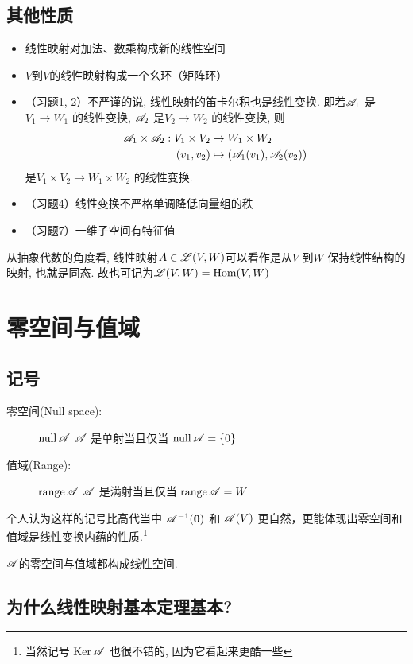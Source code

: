 \subsection{其他性质}
\begin{itemize}
    \item 线性映射对加法、数乘构成新的线性空间
    \item \(V\)到\(V\)的线性映射构成一个幺环（矩阵环）
    \item （习题1, 2）不严谨的说, 线性映射的笛卡尔积也是线性变换. 即若\(\mathscr{A}_{1}\)
        是\(V_{1} \to W_{1}\) 的线性变换, \(\mathscr{A}_{2}\)
        是\(V_{2} \to W_{2}\) 的线性变换, 则
        \begin{align*}
            \mathscr{A}_{1} \times \mathscr{A}_{2} : V_{1}
            \times V_{2} &\to W_{1} \times W_{2}\\
            (v_{1},v_{2}) &\mapsto
            (\mathscr{A}_{1}(v_{1}),\mathscr{A}_{2}(v_{2}))
        \end{align*}
        是\(V_{1} \times V_{2} \to
        W_{1} \times W_{2}\) 的线性变换.
    \item （习题4）线性变换不严格单调降低向量组的秩
    \item （习题7）一维子空间有特征值
\end{itemize}

从抽象代数的角度看, 线性映射\(A \in \mathscr{L}(V,W)\)可以看作是从\(V\) 到\(W\)
保持线性结构的映射, 也就是同态. 故也可记为\(\mathscr{L}(V,W)=\operatorname{Hom}(V,W)\)

\section{零空间与值域}
\subsection{记号}
\begin{description}
    \item[零空间(Null space):] \(\operatorname{null} \mathscr{A}\)
        \(\mathscr{A}\) 是单射当且仅当
        \(\operatorname{null} \mathscr{A} = \{0\}\)
    \item[值域(Range):] \(\operatorname{range} \mathscr{A}\)
        \(\mathscr{A}\) 是满射当且仅当
        \(\operatorname{range} \mathscr{A} = W\)
\end{description}
个人认为这样的记号比高代当中 \(\mathscr{A}^{-1}(\mathbf{0})\) 和 \(\mathscr{A}(V)\)
更自然，更能体现出零空间和值域是线性变换内蕴的性质.\footnote{当然记号
    \(\operatorname{Ker} \mathscr{A}\) 也很不错的,
因为它看起来更酷一些 }

\(\mathscr{A}\)的零空间与值域都构成线性空间.

\subsection{为什么线性映射基本定理基本?}


